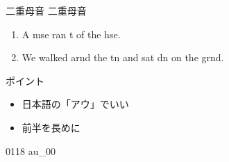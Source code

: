 \documentclass[aspectratio=169, xcolor={dvipsnames,table}]{beamer}
\begin{document}
\begin{frame}[plain]{二重母音 }
  {\Large 二重母音} {\Huge {}}

  \begin{enumerate}
    \item A mse ran t of the hse.

    \item We walked arnd the tn and sat dn on the grnd.
  \end{enumerate}

  \normalsize ポイント

  \begin{itemize}
    [circle]

    \item 日本語の「アウ」でいい

    \item 前半を長めに
  \end{itemize}

  \hfill{\tiny 0118}\,{\scriptsize {}\,{\tiny au\_00}}
\end{frame}
\end{document}
